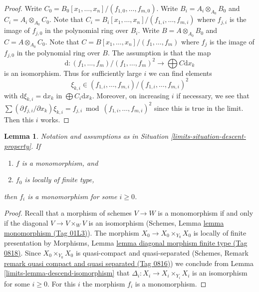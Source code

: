 \documentclass{amsart}
\theoremstyle{plain}
\newtheorem{lemma}[subsection]{Lemma}
\theoremstyle{definition}
\theoremstyle{remark}
\numberwithin{equation}{subsection}
\begin{document}
\begin{proof}
Write $C_0 = B_0[x_1, \ldots, x_n]/(f_{1, 0}, \ldots, f_{m, 0})$.
Write $B_i = A_i \otimes_{A_0} B_0$ and $C_i = A_i \otimes_{A_0} C_0$.
Note that $C_i = B_i[x_1, \ldots, x_n]/(f_{1, i}, \ldots, f_{m, i})$
where $f_{j, i}$ is the image of $f_{j, 0}$ in the polynomial ring
over $B_i$. Write $B = A \otimes_{A_0} B_0$ and $C = A \otimes_{A_0} C_0$.
Note that $C = B[x_1, \ldots, x_n]/(f_1, \ldots, f_m)$
where $f_j$ is the image of $f_{j, 0}$ in the polynomial ring
over $B$. The assumption is that the map
$$
\text{d} :
(f_1, \ldots, f_m)/(f_1, \ldots, f_m)^2
\longrightarrow
\bigoplus C \text{d}x_k
$$
is an isomorphism. Thus for sufficiently large $i$ we can find elements
$$
\xi_{k, i} \in (f_{1, i}, \ldots, f_{m, i})/(f_{1, i}, \ldots, f_{m, i})^2
$$
with $\text{d}\xi_{k, i} = \text{d}x_k$ in $\bigoplus C_i \text{d}x_k$.
Moreover, on increasing $i$ if necessary, we see that
$\sum (\partial f_{j, i}/\partial x_k) \xi_{k, i} =
f_{j, i} \bmod (f_{1, i}, \ldots, f_{m, i})^2$
since this is true in the limit. Then this $i$ works.
\end{proof}


\begin{lemma}
\label{limits-lemma-descend-monomorphism}
Notation and assumptions as in Situation \ref{limits-situation-descent-property}.
If
\begin{enumerate}
\item $f$ is a monomorphism, and
\item $f_0$ is locally of finite type,
\end{enumerate}
then $f_i$ is a monomorphism for some $i \geq 0$.
\end{lemma}

\begin{proof}
Recall that a morphism of schemes $V \to W$ is a monomorphism if and
only if the diagonal $V \to V \times_W V$ is an isomorphism
(Schemes, Lemma \href{https://stacks.math.columbia.edu/tag/01L3}{lemma monomorphism (Tag 01L3)}).
The morphism $X_0 \to X_0 \times_{Y_0} X_0$ is locally of finite
presentation by
Morphisms, Lemma \href{https://stacks.math.columbia.edu/tag/0818}{lemma diagonal morphism finite type (Tag 0818)}.
Since $X_0 \times_{Y_0} X_0$ is quasi-compact and quasi-separated
(Schemes, Remark \href{https://stacks.math.columbia.edu/tag/0816}{remark quasi compact and quasi separated (Tag 0816)})
we conclude from
Lemma \ref{limits-lemma-descend-isomorphism}
that $\Delta_i : X_i \to X_i \times_{Y_i} X_i$ is an isomorphism for
some $i \geq 0$. For this $i$ the morphism $f_i$ is a monomorphism.
\end{proof}
\end{document}
